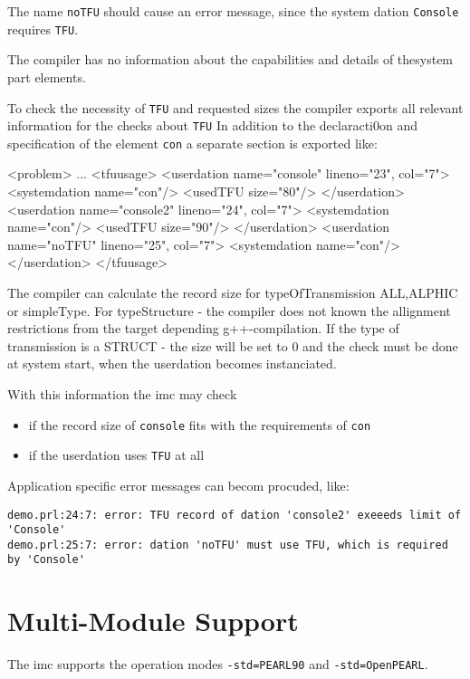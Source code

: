 The name \texttt{noTFU} should cause an error message,
since the system dation \texttt{Console} requires \texttt{TFU}.

The compiler  has no information about the capabilities and details
of thesystem part elements.

To check the necessity of \texttt{TFU} and requested sizes the compiler 
exports all relevant information for the checks about \texttt{TFU}
In addition to the declaracti0on and specification of the element \texttt{con}
a separate section is exported like:

\begin{XMLCode}
 <problem>
  ...
  <tfuusage>
    <userdation name="console" lineno="23", col="7">
       <systemdation name="con"/>
       <usedTFU size="80"/>
    </userdation>
    <userdation name="console2" lineno="24", col="7">
       <systemdation name="con"/>
       <usedTFU size="90"/>
    </userdation>
    <userdation name="noTFU" lineno="25", col="7">
       <systemdation name="con"/>
    </userdation>
  </tfuusage>
\end{XMLCode}

The compiler can calculate the record size for typeOfTransmission ALL,ALPHIC or simpleType. For typeStructure - the compiler does not known the allignment
restrictions from the target depending g++-compilation.
If the type of transmission is a STRUCT - the size will be set to 0
and the check must be done at system start,
when the userdation becomes instanciated.

With this information the imc may check
\begin{itemize}
\item if the record size  of \texttt{console} fits with the requirements of 
    \texttt{con}
\item if the userdation uses \texttt{TFU} at all
\end{itemize} 

Application specific error messages can becom procuded, like:

\lstset{breaklines=true}
\begin{lstlisting}
demo.prl:24:7: error: TFU record of dation 'console2' exeeeds limit of 'Console'
demo.prl:25:7: error: dation 'noTFU' must use TFU, which is required by 'Console'
\end{lstlisting}


\section{Multi-Module Support}
The imc supports the operation modes \verb|-std=PEARL90| and \verb|-std=OpenPEARL|.

